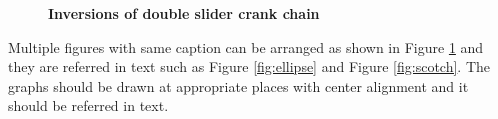 \documentclass[BTech]{srmuthesis}
\begin{document}
    \begin{figure}[htpb]
    \centering
     \hspace{10mm}
\caption{\bf Inversions of double slider crank chain}
\label{fig:4s}
    \end{figure}
     Multiple figures with same caption can be arranged as shown in Figure \ref{fig:4s} and they are referred in text such as Figure \ref{fig:ellipse} and Figure \ref{fig:scotch}. The graphs should be drawn at appropriate places with center alignment and it should be referred in text. \\
\end{document}
